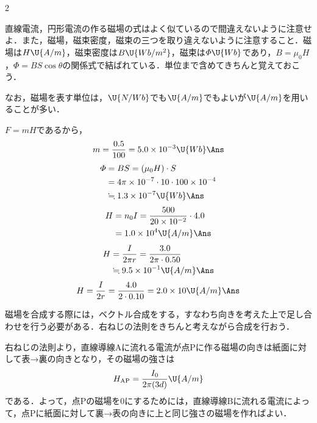 \setlength{\columnseprule}{0.4pt}
\begin{multicols}{2}
\raggedcolumns

\par\nopagebreak
\begin{sisin}
直線電流，円形電流の作る磁場の式はよく似ているので間違えないように注意せよ．また，磁場，磁束密度，磁束の三つを取り違えないように注意すること．磁場は$H\U{A/m}$，磁束密度は$B\U{Wb/m^2}$，磁束は$\varPhi\U{Wb}$であり，$B=\mu_0H$，$\varPhi=BS\cos\theta$の関係式で結ばれている．単位まで含めてきちんと覚えておこう．

なお，磁場を表す単位は，$\U{N/Wb}$でも$\U{A/m}$でもよいが$\U{A/m}$を用いることが多い．
\end{sisin}
\KaiHead
\begin{komon}
 $F=mH$であるから，
       \[m=\frac{0.5}{100}=5.0\times 10^{-3}\U{Wb}\Ans\]
 \[\begin{aligned}
         \varPhi&=BS=(\mu_0H)\cdot S\\
          &=4\pi\times 10^{-7}\cdot 10\cdot 100\times 10^{-4}\\
          &\fallingdotseq 1.3\times 10^{-7}\U{Wb}\Ans
       \end{aligned}\]
 \[\begin{aligned}H&=n_0I=\frac{500}{20\times 10^{-2}}\cdot 4.0\\&=1.0\times 10^4\U{A/m}\Ans\end{aligned}\]
 \[\begin{aligned}H&=\frac{I}{2\pi r}=\frac{3.0}{2\pi\cdot 0.50}\\&\fallingdotseq 9.5\times 10^{-1}\U{A/m}\Ans\end{aligned}\]
 \[H=\frac{I}{2r}=\frac{4.0}{2\cdot 0.10}=2.0\times 10\U{A/m}\Ans\]
\end{komon}

\par\nopagebreak
\begin{sisin}
磁場を合成する際には，ベクトル合成をする，すなわち向きを考えた上で足し合わせを行う必要がある．右ねじの法則をきちんと考えながら合成を行おう．
\end{sisin}
\KaiHead
\begin{komon}
\item[{\makebox[1.9zw][r]{(1)(2)}}] 右ねじの法則より，直線導線$\mathrm{A}$に流れる電流が点$\mathrm{P}$に作る磁場の向きは紙面に対して表→裏の向きとなり，その磁場の強さは
       \[H_{\mathrm{AP}}=\frac{I_0}{2\pi(3d)}\U{A/m}\]
       である．よって，点$\mathrm{P}$の磁場を$0$にするためには，直線導線$\mathrm{B}$に流れる電流によって，点$\mathrm{P}$に紙面に対して裏→表の向きに上と同じ強さの磁場を作ればよい．


\end{komon}
\end{multicols}
